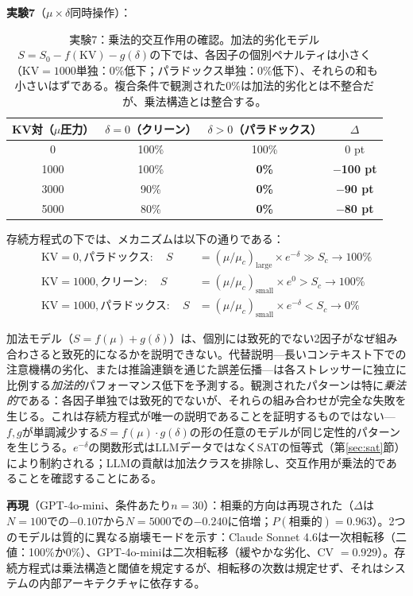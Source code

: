 \documentclass[11pt,a4paper]{article}
\begin{document}
\textbf{実験7}（$\mu \times \delta$同時操作）：

\begin{table}[htbp]
\centering
\begin{tabular}{cccc}
\toprule
\textbf{KV対（$\mu$圧力）} & \textbf{$\delta = 0$（クリーン）} & \textbf{$\delta > 0$（パラドックス）} & \textbf{$\Delta$} \\
\midrule
0 & 100\% & 100\% & 0 pt \\
1000 & 100\% & \textbf{0\%} & \textbf{$-$100 pt} \\
3000 & 90\% & \textbf{0\%} & \textbf{$-$90 pt} \\
5000 & 80\% & \textbf{0\%} & \textbf{$-$80 pt} \\
\bottomrule
\end{tabular}
\caption{実験7：乗法的交互作用の確認。加法的劣化モデル$S = S_0 - f(\text{KV}) - g(\delta)$の下では、各因子の個別ペナルティは小さく（KV$=1000$単独：0\%低下；パラドックス単独：0\%低下）、それらの和も小さいはずである。複合条件で観測された0\%は加法的劣化とは不整合だが、乗法構造とは整合する。}
\label{tab:exp7}
\end{table}

存続方程式の下では、メカニズムは以下の通りである：
\begin{align*}
\text{KV}=0, \text{パラドックス}: \quad S &= (\mu/\mu_c)_{\text{large}} \times e^{-\delta} \gg S_c \to 100\% \\
\text{KV}=1000, \text{クリーン}: \quad S &= (\mu/\mu_c)_{\text{small}} \times e^{0} > S_c \to 100\% \\
\text{KV}=1000, \text{パラドックス}: \quad S &= (\mu/\mu_c)_{\text{small}} \times e^{-\delta} < S_c \to 0\%
\end{align*}

加法モデル（$S = f(\mu) + g(\delta)$）は、個別には致死的でない2因子がなぜ組み合わさると致死的になるかを説明できない。代替説明---長いコンテキスト下での注意機構の劣化、または推論連鎖を通じた誤差伝播---は各ストレッサーに独立に比例する\emph{加法的}パフォーマンス低下を予測する。観測されたパターンは特に\emph{乗法的}である：各因子単独では致死的でないが、それらの組み合わせが完全な失敗を生じる。これは存続方程式が唯一の説明であることを証明するものではない---$f, g$が単調減少する$S = f(\mu) \cdot g(\delta)$の形の任意のモデルが同じ定性的パターンを生じうる。$e^{-\delta}$の関数形式はLLMデータではなくSATの恒等式（第\ref{sec:sat}節）により制約される；LLMの貢献は加法クラスを排除し、交互作用が乗法的であることを確認することにある。

\textbf{再現}（GPT-4o-mini、条件あたり$n = 30$）：相乗的方向は再現された（$\Delta$は$N=100$での$-0.107$から$N=5000$での$-0.240$に倍増；$P(\text{相乗的}) = 0.963$）。2つのモデルは質的に異なる崩壊モードを示す：Claude Sonnet 4.6は一次相転移（二値：100\%か0\%）、GPT-4o-miniは二次相転移（緩やかな劣化、CV $= 0.929$）。存続方程式は乗法構造と閾値を規定するが、相転移の次数は規定せず、それはシステムの内部アーキテクチャに依存する。
\end{document}
